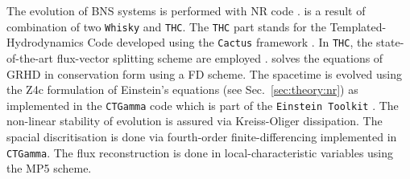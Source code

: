 The evolution of \ac{BNS} systems is performed with \wisky{} \ac{NR} code
 \citep{Radice:2013apa,Radice:2012cu,Radice:2013xpa,Radice:2013hxh,
    Radice:2015nva,Radice:2016dwd,Radice:2018pdn,Radice:2020ids}.
\wisky{} is a result of combination of two \texttt{Whisky} \citep{Baiotti:2004wn} and \texttt{THC}.
The \texttt{THC} part stands for the Templated-Hydrodynamics Code developed using the \texttt{Cactus} framework 
\citep{Goodale:2003}. 
In \texttt{THC}, the state-of-the-art flux-vector splitting scheme are employed . 
%
%
%
\wisky{} solves the equations of \ac{GRHD} in conservation form using a \ac{FD} scheme. 
%
The spacetime is evolved using the Z4c formulation of Einstein's equations
(see Sec.~\ref{sec:theory:nr}) as implemented in the \texttt{CTGamma} code
\citep{Pollney:2009yz,Reisswig:2013sqa}
which is part of the \texttt{Einstein Toolkit} \citep{Loffler:2011ay}.
%
%
The non-linear stability of evolution is assured via Kreiss-Oliger dissipation. 
The spacial discritisation is done via fourth-order finite-differencing implemented in \texttt{CTGamma}.
%
The flux reconstruction is done in local-characteristic variables using the \ac{MP5} scheme.


